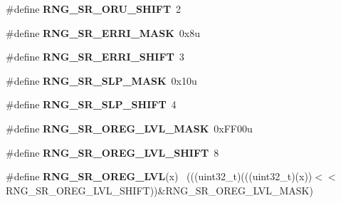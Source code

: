 \begin{DoxyCompactItemize}
\item 
\hypertarget{group___r_n_g___register___masks_ga6b0320c0b7ca685c61880f0240959cc8}{}\#define {\bfseries R\+N\+G\+\_\+\+S\+R\+\_\+\+O\+R\+U\+\_\+\+S\+H\+I\+F\+T}~2\label{group___r_n_g___register___masks_ga6b0320c0b7ca685c61880f0240959cc8}

\item 
\hypertarget{group___r_n_g___register___masks_ga3c85bd2671168b6c4deb3d24f258e994}{}\#define {\bfseries R\+N\+G\+\_\+\+S\+R\+\_\+\+E\+R\+R\+I\+\_\+\+M\+A\+S\+K}~0x8u\label{group___r_n_g___register___masks_ga3c85bd2671168b6c4deb3d24f258e994}

\item 
\hypertarget{group___r_n_g___register___masks_ga83b4268bad929f74a99f2e7df81d7334}{}\#define {\bfseries R\+N\+G\+\_\+\+S\+R\+\_\+\+E\+R\+R\+I\+\_\+\+S\+H\+I\+F\+T}~3\label{group___r_n_g___register___masks_ga83b4268bad929f74a99f2e7df81d7334}

\item 
\hypertarget{group___r_n_g___register___masks_ga1a51652171cedf780e82c20ff41119f8}{}\#define {\bfseries R\+N\+G\+\_\+\+S\+R\+\_\+\+S\+L\+P\+\_\+\+M\+A\+S\+K}~0x10u\label{group___r_n_g___register___masks_ga1a51652171cedf780e82c20ff41119f8}

\item 
\hypertarget{group___r_n_g___register___masks_ga07a631716ed84be9e6c0fb94308ac55f}{}\#define {\bfseries R\+N\+G\+\_\+\+S\+R\+\_\+\+S\+L\+P\+\_\+\+S\+H\+I\+F\+T}~4\label{group___r_n_g___register___masks_ga07a631716ed84be9e6c0fb94308ac55f}

\item 
\hypertarget{group___r_n_g___register___masks_ga5ba45a08f2c283764e959f185747e549}{}\#define {\bfseries R\+N\+G\+\_\+\+S\+R\+\_\+\+O\+R\+E\+G\+\_\+\+L\+V\+L\+\_\+\+M\+A\+S\+K}~0x\+F\+F00u\label{group___r_n_g___register___masks_ga5ba45a08f2c283764e959f185747e549}

\item 
\hypertarget{group___r_n_g___register___masks_ga2e38a684aa9e1b164fb2a00db509ccf9}{}\#define {\bfseries R\+N\+G\+\_\+\+S\+R\+\_\+\+O\+R\+E\+G\+\_\+\+L\+V\+L\+\_\+\+S\+H\+I\+F\+T}~8\label{group___r_n_g___register___masks_ga2e38a684aa9e1b164fb2a00db509ccf9}

\item 
\hypertarget{group___r_n_g___register___masks_ga4bd02dafa8c2a5faebb6d18dcb292122}{}\#define {\bfseries R\+N\+G\+\_\+\+S\+R\+\_\+\+O\+R\+E\+G\+\_\+\+L\+V\+L}(x)                                          ~(((uint32\+\_\+t)(((uint32\+\_\+t)(x))$<$$<$R\+N\+G\+\_\+\+S\+R\+\_\+\+O\+R\+E\+G\+\_\+\+L\+V\+L\+\_\+\+S\+H\+I\+F\+T))\&R\+N\+G\+\_\+\+S\+R\+\_\+\+O\+R\+E\+G\+\_\+\+L\+V\+L\+\_\+\+M\+A\+S\+K)\label{group___r_n_g___register___masks_ga4bd02dafa8c2a5faebb6d18dcb292122}


\end{DoxyCompactItemize}
